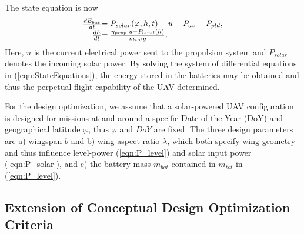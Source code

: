 The state equation is now
\begin{equation}\label{eqn:StateEquations}
\begin{array}{r@{}l}
\frac{dE_{bat}}{dt}&=P_{solar}(\varphi,h,t)-u-P_{av}-P_{pld},\\
\frac{dh}{dt}&=\frac{\eta_{prop}\cdot u-P_{level}(h)}{m_{tot}g} .
\end{array}
\end{equation}
Here, $u$ is the current electrical power sent to the propulsion system and $P_{solar}$ denotes the incoming solar power. By solving the system of differential equations in (\ref{eqn:StateEquations}), the energy stored in the batteries may be obtained and thus the perpetual flight capability of the UAV determined.

For the design optimization, we assume that a solar-powered UAV configuration is designed for missions at and around a specific Date of the Year (DoY) and geographical latitude $\varphi$, thus $\varphi$ and $DoY$ are fixed. The three design parameters are a) wingspan $b$ and b) wing aspect ratio $\lambda$, which both specify wing geometry and thus influence level-power (\ref{eqn:P_level}) and solar input power (\ref{eqn:P_solar}), and c) the battery mass $m_{bat}$ contained in $m_{tot}$ in (\ref{eqn:P_level}).

\subsection{Extension of Conceptual Design Optimization Criteria}

